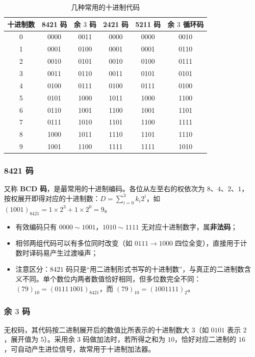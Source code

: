\begin{table}[!htbp]
    \centering
    \caption{几种常用的十进制代码}
    \label{tab:bcd}
    \begin{tabular}{@{}cccccc@{}}
        \toprule
        十进制数 & 8421 码 & 余 $3$ 码 & 2421 码 & 5211 码 & 余 $3$ 循环码 \\
        \midrule
        0 & 0000 & 0011 & 0000 & 0000 & 0010 \\
        1 & 0001 & 0100 & 0001 & 0001 & 0110 \\
        2 & 0010 & 0101 & 0010 & 0100 & 0111 \\
        3 & 0011 & 0110 & 0011 & 0101 & 0101 \\
        4 & 0100 & 0111 & 0100 & 0111 & 0100 \\
        5 & 0101 & 1000 & 1011 & 1000 & 1100 \\
        6 & 0110 & 1001 & 1100 & 1001 & 1101 \\
        7 & 0111 & 1010 & 1101 & 1100 & 1111 \\
        8 & 1000 & 1011 & 1110 & 1101 & 1110 \\
        9 & 1001 & 1100 & 1111 & 1111 & 1010 \\
        \bottomrule
    \end{tabular}
\end{table}

\subsubsection{8421 码}
又称 \textbf{BCD 码}，是最常用的十进制编码。各位从左至右的权依次为 $8$、$4$、$2$、$1$，按权展开即得对应的十进制数：$D=\sum_{i=0}^{3}k_i2^{i}$，如 $(1001)_{8421}=1\times2^3+1\times2^0=9$。
\begin{itemize}
    \item 有效编码只有 $0000\sim1001$，$1010\sim1111$ 无对应十进制数字，属\textbf{非法码}；
    \item 相邻两组代码可以有多位同时改变（如 $0111\to1000$ 四位全变），直接用于计数时译码易产生过渡噪声；
    \item 注意区分：$8421$ 码只是``用二进制形式书写的十进制数''，与真正的二进制数含义不同。单个数位内两者数值恰好相同，但多位数完全不同：$(79)_{10}=(0111\,1001)_{8421}$，而 $(79)_{10}=(1001111)_2$。
\end{itemize}

\subsubsection{余 $3$ 码}
无权码，其代码按二进制展开后的数值比所表示的十进制数大 $3$（如 $0101$ 表示 $2$，展开值为 $5$）。采用余 $3$ 码做加法时，若所得之和为 $10$，恰好对应二进制的 $16$，可自动产生进位信号，故常用于十进制加法器。

